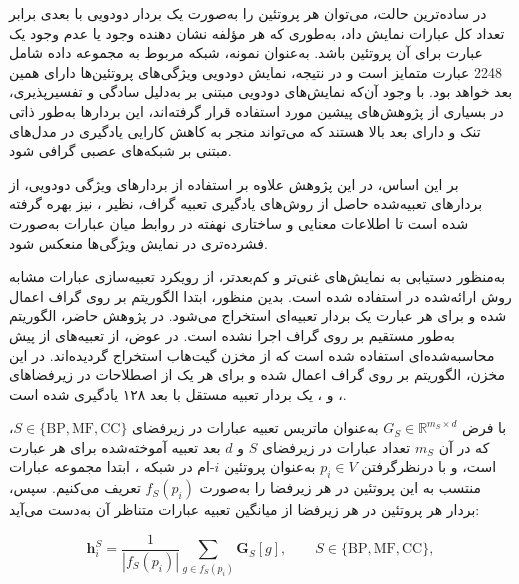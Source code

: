  در ساده‌ترین حالت، می‌توان هر پروتئین را به‌صورت یک بردار دودویی با بعدی برابر تعداد کل عبارات  نمایش داد، به‌طوری‌ که هر مؤلفه نشان‌ دهنده وجود یا عدم وجود یک عبارت  برای آن پروتئین باشد. به‌عنوان نمونه، شبکه  مربوط به مجموعه‌ داده  شامل 2248 عبارت  متمایز است و در نتیجه، نمایش دودویی ویژگی‌های پروتئین‌ها دارای همین بعد خواهد بود. با وجود آن‌که نمایش‌های دودویی مبتنی بر  به‌دلیل سادگی و تفسیرپذیری، در بسیاری از پژوهش‌های پیشین مورد استفاده قرار گرفته‌اند، این بردارها به‌طور ذاتی تنک و دارای بعد بالا هستند که می‌تواند منجر به کاهش کارایی یادگیری در مدل‌های مبتنی بر شبکه‌های عصبی گرافی شود.

 بر این اساس، در این پژوهش علاوه بر استفاده از بردارهای ویژگی دودویی، از بردارهای تعبیه‌شده حاصل از روش‌های یادگیری تعبیه گراف، نظیر ، نیز بهره گرفته شده است تا اطلاعات معنایی و ساختاری نهفته در روابط میان عبارات  به‌صورت فشرده‌تری در نمایش ویژگی‌ها منعکس شود.
 
 به‌منظور دستیابی به نمایش‌های غنی‌تر و کم‌بعدتر، از رویکرد تعبیه‌سازی عبارات  مشابه روش ارائه‌شده در \cite{ieremie2022transformergo} استفاده شده است. بدین منظور، ابتدا الگوریتم  بر روی گراف  اعمال شده و برای هر عبارت  یک بردار تعبیه‌ای استخراج می‌شود. در پژوهش حاضر، الگوریتم  به‌طور مستقیم بر روی گراف  اجرا نشده است. در عوض، از تعبیه‌های از پیش محاسبه‌شده‌ای استفاده شده است که از مخزن گیت‌هاب استخراج گردیده‌اند. در این مخزن، الگوریتم  بر روی گراف  اعمال شده و برای هر یک از اصطلاحات  در زیرفضاهای ،  و ، یک بردار تعبیه مستقل با بعد ۱۲۸ یادگیری شده است. 
 
 
 
 با فرض $G_{S} \in \mathbb{R}^{m_S \times d}$ به‌عنوان ماتریس تعبیه عبارات  در زیر‌فضای $S \in \{\mathrm{BP},\mathrm{MF},\mathrm{CC}\}$، که در آن $m_S$ تعداد عبارات  در زیر‌فضای $S$ و $d$ بعد تعبیه آموخته‌شده برای هر عبارت است، و با درنظرگرفتن $p_i\in V$ به‌عنوان پروتئین $i$-ام در شبکه ، ابتدا مجموعه عبارات  منتسب به این پروتئین در هر زیر‌فضا را به‌صورت $f_S(p_i)$ تعریف می‌کنیم. سپس، بردار هر پروتئین در هر زیر‌فضا از میانگین تعبیه عبارات متناظر آن به‌دست می‌آید:
 
 \begin{equation}
 	\mathbf{h}_{i}^{S}=
 	\frac{1}{\left|f_S(p_i)\right|}
 	\sum_{g \in f_S(p_i)}
 	\mathbf{G}_{S}[g],
 	\qquad S\in\{\mathrm{BP},\mathrm{MF},\mathrm{CC}\},
 	\label{eq:go-mean}
 \end{equation}
 
